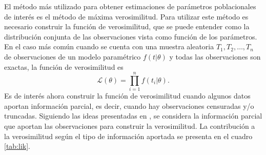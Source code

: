\documentclass[11pt,a4paper]{article}
\begin{document}
El método más utilizado para obtener estimaciones de parámetros poblacionales de interés es el método de máxima verosimilitud. Para utilizar este método es necesario construir la función de verosimilitud, que se puede entender como la distribución conjunta de las observaciones vista como función de los parámetros. En el caso más común cuando se cuenta con una muestra aleatoria $T_1, T_2, \dots, T_n$ de observaciones de un modelo paramétrico $f(t|\theta)$ y todas las observaciones son exactas, la función de verosimilitud es $$\mathcal{L}(\theta) = \prod_{i = 1}^n f(t_i|\theta).$$ Es de interés ahora construir la función de verosimilitud cuando algunos datos aportan información parcial, es decir, cuando hay observaciones censuradas y/o truncadas. Siguiendo las ideas presentadas en \citet{klein}, se considera la información parcial que aportan las observaciones para construir la verosimilitud. La contribución a la verosimilitud según el tipo de información aportada se presenta en el cuadro \ref{tab:lik}.

\begin{table}[htb]
\begin{center}
\end{center}
\caption{Contribución de las observaciones a la función de verosimilitud.}
\label{tab:lik}
\end{table}
\end{document}
